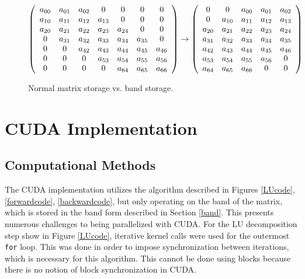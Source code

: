 \documentclass[12pt]{article}
\begin{document}
\begin{figure}[H]
\caption{Normal matrix storage vs. band storage.}
\label{bandstorage}
$$
\left(
\begin{array}{c c c c c c c}
a_{00} & a_{01} & a_{02} & 0 & 0 & 0 & 0\\
a_{10} & a_{11} & a_{12} & a_{13} & 0 & 0 & 0\\
a_{20} & a_{21} & a_{22} & a_{23} & a_{24} & 0 & 0\\
     0 & a_{31} & a_{32} & a_{33} & a_{34} & a_{35} & 0\\
     0 &      0 & a_{42} & a_{43} & a_{44} & a_{45} & a_{46}\\
     0 &      0 &      0 & a_{53} & a_{54} & a_{55} & a_{56}\\
     0 &      0 &      0 &      0 & a_{64} & a_{65} & a_{66}\\
\end{array}
\right)
\rightarrow
\left(
\begin{array}{c c c c c}
     0 &      0 & a_{00} & a_{01} & a_{02}\\
     0 & a_{10} & a_{11} & a_{12} & a_{13}\\
a_{20} & a_{21} & a_{22} & a_{23} & a_{24}\\
a_{31} & a_{32} & a_{33} & a_{34} & a_{35}\\
a_{42} & a_{43} & a_{44} & a_{45} & a_{46}\\
a_{53} & a_{54} & a_{55} & a_{56} & 0     \\
a_{64} & a_{65} & a_{66} & 0      & 0     
\end{array}
\right)
$$
\end{figure}

\section{CUDA Implementation}
\label{sec:implimentation}

\subsection{Computational Methods}

The CUDA implementation utilizes the algorithm described in Figures
\ref{LUcode}, \ref{forwardcode}, \ref{backwardcode}, but only operating on the
band of the matrix, which is stored in the band form described in Section
\ref{band}. This presents numerous challenges to being parallelized with CUDA.
For the LU decomposition step show in Figure \ref{LUcode}, iterative kernel
calls were used for the outermost \texttt{for} loop. This was done in order to
impose synchronization between iterations, which is necessary for this
algorithm. This cannot be done using blocks because there is no notion of block
synchronization in CUDA.  
\end{document}

